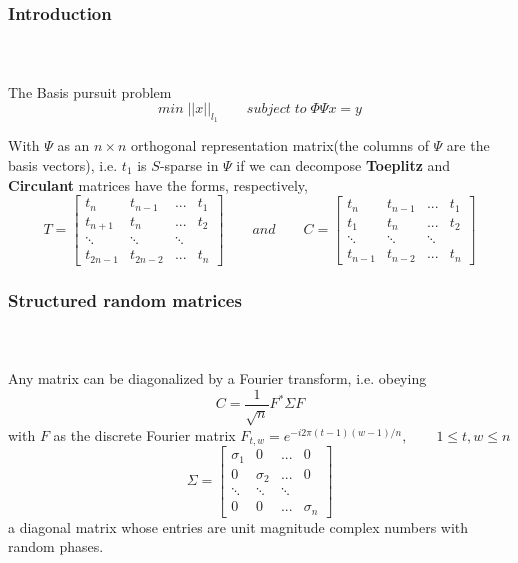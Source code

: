 
\begin{frame}[t]
\frametitle{Introduction}
\framesubtitle{~~}  %

The Basis pursuit problem 
\begin{equation}
min  \;||x||_{l_1} \qquad   subject \; to \; \Phi \Psi x=y
\end{equation}

\small
With $\Psi$ as an $n \times n$ orthogonal representation matrix(the columns of $\Psi$ are the basis vectors), i.e. $t_{1}$ is $S$-sparse in $\Psi$ if we can decompose 
\normalfont
\textbf{Toeplitz} and \textbf{Circulant} matrices have the forms, respectively,
\\


$$
T = \begin{bmatrix}
	t_{n} & t_{n-1} & ...& t_{1}           \\[0.3em]
	t_{n+1} & t_n & ... & t_{2} \\[0.3em]
	\ddots &\ddots & \ddots &    \\[0.3em]
	t_{2n-1} & t_{2n-2}& ... & t_{n}         
\end{bmatrix}
\qquad and \qquad
C = \begin{bmatrix}
t_{n} & t_{n-1} & ...& t_{1}           \\[0.3em]
t_{1} & t_{n} & ... & t_{2} \\[0.3em]
\ddots &\ddots & \ddots &      \\[0.3em]
t_{n-1} & t_{n-2}& ... & t_{n}        
\end{bmatrix} 
$$
\end{frame}
\begin{frame}[t]
\frametitle{Structured random matrices}
\framesubtitle{~~}  %
	Any matrix can be diagonalized by a Fourier transform, i.e. obeying
	$$ C=\frac{1}{\sqrt{n}} F^* \Sigma F $$ with $F$ as the discrete Fourier matrix
	$F_{t,w}=e^{-i2\pi(t-1)(w-1)/n}, \qquad 1 \le t,w \le n$
$$
\Sigma = \begin{bmatrix}
	\sigma_{1} & 0 & ...& 0           \\[0.3em]
	0 & \sigma_{2} & ... & 0 \\[0.3em]
	\ddots &\ddots & \ddots &      \\[0.3em]
	0 & 0 & ... & \sigma_{n}        
\end{bmatrix} $$
a diagonal matrix whose entries are unit magnitude complex numbers with random phases.
\end{frame}


